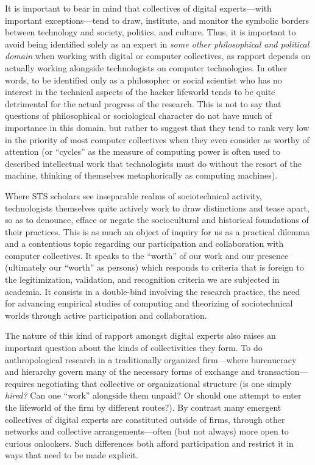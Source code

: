 \documentclass[10pt,letter,oneside]{scrartcl}
\begin{document}
It is important to bear in mind that collectives of digital
experts---with important exceptions---tend to draw, institute, and
monitor the symbolic borders between technology and society, politics,
and culture. Thus, it is important to avoid being identified solely as
an expert in \emph{some other philosophical and political domain} when 
working with digital or computer collectives, as rapport depends on 
actually working alongside technologists on computer technologies.  
In other words, to be identified only as a philosopher or social scientist who has no interest in the technical aspects of the hacker lifeworld tends to be quite
detrimental for the actual progress of the research. This is not to say that
questions of philosophical or sociological character do not have much of 
importance in this domain, but rather to suggest that they tend to rank 
very low in the priority of most computer collectives when they even
consider as worthy of attention (or ``cycles'' as the measure of computing
power is often used to described intellectual work that technologists
must do without the resort of the machine, thinking of themselves 
metaphorically as computing machines).

Where STS scholars see inseparable realms of sociotechnical activity,
technologists themselves quite actively work to draw distinctions and
tease apart, so as to denounce, efface or negate the sociocultural and
historical foundations of their practices.  This is as much an object
of inquiry for us as a practical dilemma and a contentious topic
regarding our participation and collaboration with computer
collectives. It speaks to the ``worth'' of our work \cite{Stark2009} and
our presence (ultimately our ``worth'' as persons) which responds to
criteria that is foreign to the legitimization, validation, and
recognition criteria we are subjected in academia.  It consists in a
double-bind involving the research practice, the need for advancing
empirical studies of computing and theorizing of sociotechnical worlds
through active participation and collaboration.

The nature of this kind of rapport amongst digital experts also raises
an important question about the kinds of collectivities they form.  To
do anthropological research in a traditionally organized firm---where
bureaucracy and hierarchy govern many of the necessary forms of
exchange and transaction---requires negotiating that collective or
organizational structure (is one simply \emph{hired?} Can one ``work''
alongside them unpaid? Or should one attempt to enter the lifeworld of
the firm by different routes?).  By contrast many emergent collectives
of digital experts are constituted outside of firms, through other
networks and collective arrangements---often (but not always) more
open to curious onlookers.  Such differences both afford participation
and restrict it in ways that need to be made explicit.
\end{document}

